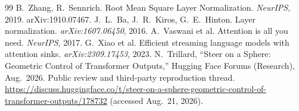 \documentclass{article}
\begin{document}
\begin{thebibliography}{99}
 B.~Zhang, R.~Sennrich. Root Mean Square Layer Normalization. \emph{NeurIPS}, 2019. arXiv:1910.07467.
 J.~L.~Ba, J.~R.~Kiros, G.~E.~Hinton. Layer normalization. \emph{arXiv:1607.06450}, 2016.
 A.~Vaswani et al. Attention is all you need. \emph{NeurIPS}, 2017.
 G.~Xiao et al. Efficient streaming language models with attention sinks. \emph{arXiv:2309.17453}, 2023.
 N.~Trillard, ``Steer on a Sphere: Geometric Control of Transformer Outputs,'' Hugging Face Forums (Research), Aug.\ 2026. Public review and third-party reproduction thread. \url{https://discuss.huggingface.co/t/steer-on-a-sphere-geometric-control-of-transformer-outputs/178732} (accessed Aug.\ 21, 2026).
\end{thebibliography}
\end{document}
